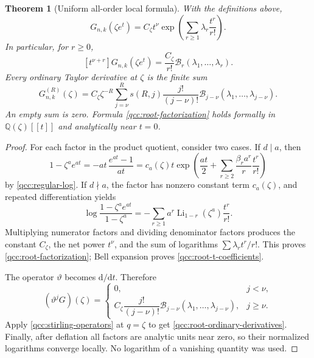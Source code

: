 \documentclass[11pt,a4paper,oneside,openany]{book}
\newtheorem{theorem}{Theorem}[chapter]
\theoremstyle{definition}
\theoremstyle{remark}
\newcommand{\Q}{\mathbb Q}
\newcommand{\Y}[1]{\mathcal B_{#1}}
\DeclareMathOperator{\Li}{Li}
\newcommand{\logq}{\vartheta}
\begin{document}
\begin{theorem}[Uniform all-order local formula]\label{qcc:root-jets}
With the definitions above,
\begin{equation}\label{qcc:root-factorization}
 \boxed{\quad
 G_{n,k}(\zeta e^t)
  =C_\zeta t^\nu
     \exp\left(\sum_{r\ge1}\lambda_r\frac{t^r}{r!}\right).
 \quad}
\end{equation}
In particular, for \(r\ge0\),
\begin{equation}\label{qcc:root-t-coefficients}
 [t^{\nu+r}]G_{n,k}(\zeta e^t)
       =\frac{C_\zeta}{r!}\Y r(\lambda_1,\ldots,\lambda_r).
\end{equation}
Every ordinary Taylor derivative at \(\zeta\) is the finite sum
\begin{equation}\label{qcc:root-ordinary-derivatives}
 G_{n,k}^{(R)}(\zeta)
 =C_\zeta\zeta^{-R}
   \sum_{j=\nu}^{R}s(R,j)\frac{j!}{(j-\nu)!}
               \Y{j-\nu}(\lambda_1,\ldots,\lambda_{j-\nu}).
\end{equation}
An empty sum is zero. Formula \eqref{qcc:root-factorization} holds formally
in \(\Q(\zeta)[[t]]\) and analytically near \(t=0\).
\end{theorem}
\begin{proof}
For each factor in the product quotient, consider two cases. If \(d\mid a\),
then
\[
 1-\zeta^ae^{at}=-at\,\frac{e^{at}-1}{at}
 =c_a(\zeta)t
     \exp\left(\frac{at}{2}
          +\sum_{r\ge2}\frac{\beta_ra^r}{r}\frac{t^r}{r!}\right)
\]
by \cref{qcc:regular-log}. If \(d\nmid a\), the factor has nonzero
constant term \(c_a(\zeta)\), and repeated differentiation yields
\[
 \log\frac{1-\zeta^ae^{at}}{1-\zeta^a}
 =-\sum_{r\ge1}a^r\Li_{1-r}(\zeta^a)\frac{t^r}{r!}.
\]
Multiplying numerator factors and dividing denominator factors produces the
constant \(C_\zeta\), the net power \(t^\nu\), and the sum of logarithms
\(\sum\lambda_rt^r/r!\). This proves \eqref{qcc:root-factorization};
Bell expansion proves \eqref{qcc:root-t-coefficients}.

The operator \(\logq\) becomes \(\mathrm d/\mathrm dt\). Therefore
\[
 (\logq^jG)(\zeta)=
 \begin{cases}
 0,&j<\nu,\\
 C_\zeta\dfrac{j!}{(j-\nu)!}
        \Y{j-\nu}(\lambda_1,\ldots,\lambda_{j-\nu}),&j\ge\nu.
 \end{cases}
\]
Apply \eqref{qcc:stirling-operators} at \(q=\zeta\) to get
\eqref{qcc:root-ordinary-derivatives}. Finally, after deflation all factors
are analytic units near zero, so their normalized logarithms converge locally.
No logarithm of a vanishing quantity was used.
\end{proof}
\end{document}
